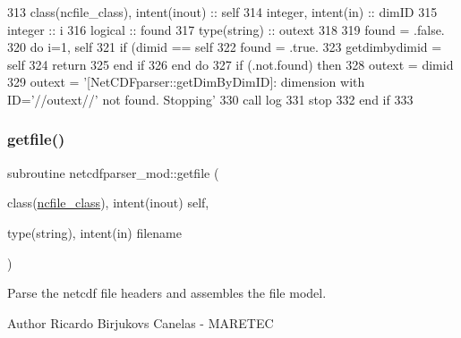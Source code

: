 \begin{DoxyCode}
313     \textcolor{keywordtype}{class}(ncfile\_class), \textcolor{keywordtype}{intent(inout)} :: self
314     \textcolor{keywordtype}{integer}, \textcolor{keywordtype}{intent(in)} :: dimID
315     \textcolor{keywordtype}{integer} :: i
316     \textcolor{keywordtype}{logical} :: found
317     \textcolor{keywordtype}{type}(string) :: outext
318 
319     found = .false.
320     \textcolor{keywordflow}{do} i=1, self%
321         \textcolor{keywordflow}{if} (dimid == self%
322             found = .true.
323             getdimbydimid = self%
324             \textcolor{keywordflow}{return}
325 \textcolor{keywordflow}{        end if}
326 \textcolor{keywordflow}{    end do}
327     \textcolor{keywordflow}{if} (.not.found) \textcolor{keywordflow}{then}
328         outext = dimid
329         outext = \textcolor{stringliteral}{'[NetCDFparser::getDimByDimID]: dimension with ID='}//outext//\textcolor{stringliteral}{' not found. Stopping'}
330         \textcolor{keyword}{call }log%
331         stop
332 \textcolor{keywordflow}{    end if}
333 
\end{DoxyCode}
\mbox{\label{namespacenetcdfparser__mod_a57c39a4003778a6bf90cfd36b69380bc}} 
\subsubsection{\texorpdfstring{getfile()}{getfile()}}
{\footnotesize\ttfamily subroutine netcdfparser\+\_\+mod\+::getfile (\begin{DoxyParamCaption}\item[{class(\mbox{\hyperlink{structnetcdfparser__mod_1_1ncfile__class}{ncfile\+\_\+class}}), intent(inout)}]{self,  }\item[{type(string), intent(in)}]{filename }\end{DoxyParamCaption})\hspace{0.3cm}{\ttfamily [private]}}



Parse the netcdf file headers and assembles the file model. 

\begin{DoxyAuthor}{Author}
Ricardo Birjukovs Canelas -\/ M\+A\+R\+E\+T\+EC 
\end{DoxyAuthor}

